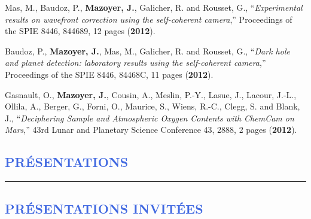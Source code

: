 \documentclass[11pt,a4paper, french]{article}
\begin{document}
\begin{etaremune}
\item Mas, M., Baudoz, P., \textbf{Mazoyer, J.}, Galicher, R. and Rousset, G., “\textit{Experimental results on wavefront correction using the self-coherent camera},” Proceedings of the SPIE 8446, 844689, 12 pages (\textbf{2012}).
\item Baudoz, P., \textbf{Mazoyer, J.}, Mas, M., Galicher, R. and Rousset, G., “\textit{Dark hole and planet detection: laboratory results using the self-coherent camera},” Proceedings of the SPIE 8446, 84468C, 11 pages (\textbf{2012}).
\item Gasnault, O., \textbf{Mazoyer, J.}, Cousin, A., Meslin, P.-Y., Lasue, J., Lacour, J.-L., Ollila, A., Berger, G., Forni, O., Maurice, S., Wiens, R.-C., Clegg, S. and Blank, J., “\textit{Deciphering Sample and Atmospheric Oxygen Contents with ChemCam on Mars},” 43rd Lunar and Planetary Science Conference 43, 2888, 2 pages (\textbf{2012}).
\end{etaremune}

%
%
\vspace{-0.8cm}
\textcolor{RoyalBlue}{\section{\large PRÉSENTATIONS}
\vspace{-0.2cm}\hrule}
\vspace{0.4cm}

\textcolor{RoyalBlue}{\subsection{\large PRÉSENTATIONS INVITÉES}}
\end{document}
